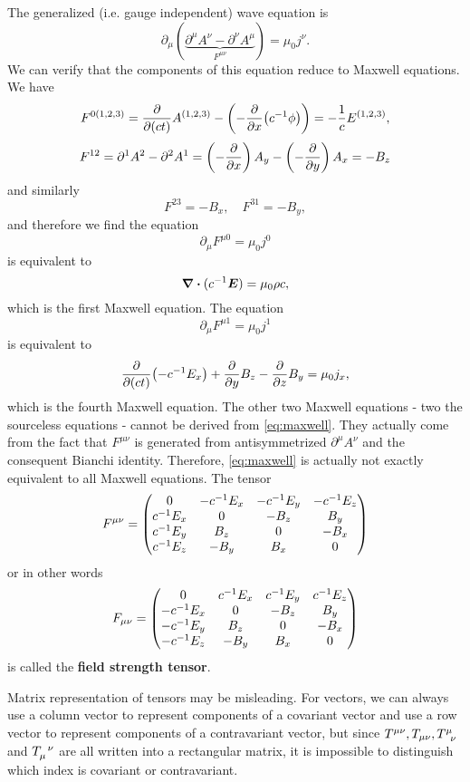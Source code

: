 \documentclass[hyperref, a4paper]{article}
\newcommand*{\concept}[1]{{\textbf{#1}}}
\begin{document}
The generalized (i.e. gauge independent) wave equation is 
\begin{equation}
    \partial_\mu (\underbrace{\partial^\mu A^\nu - \partial^\nu A^\mu}_{F^{\mu \nu}}) = \mu_0 j^\nu.
    \label{eq:maxwell}
\end{equation}
We can verify that the components of this equation reduce to Maxwell equations. 
We have 
\[
    F^{0(1,2,3)} = \pdv{(ct)} A^{(1,2,3)} - \left( - \pdv{x} (c^{-1} \phi) \right) = - \frac{1}{c} E^{(1,2,3)},
\]
\[
    F^{12} = \partial^1 A^2 - \partial^2 A^1 = \left( - \pdv{x} \right) A_y - \left( - \pdv{y} \right) A_x = - B_z
\]
and similarly 
\[
    F^{23} = - B_x, \quad F^{31} = - B_y,
\]
and therefore we find the equation
\[
    \partial_\mu F^{\mu 0} = \mu_0 j^0
\]
is equivalent to 
\[
    \div{(c^{-1} \vb*{E})} = \mu_0 \rho c,
\]
which is the first Maxwell equation. The equation
\[
    \partial_\mu F^{\mu 1} = \mu_0 j^1
\]
is equivalent to 
\[
    \pdv{(ct)} (- c^{-1} E_x) + \pdv{y} B_z - \pdv{z} B_y = \mu_0 j_x,
\]
which is the fourth Maxwell equation. The other two Maxwell equations - two the sourceless equations - cannot 
be derived from \eqref{eq:maxwell}. They actually come from the fact that $F^{\mu \nu}$ is generated from 
antisymmetrized $\partial^\mu A^\nu$ and the consequent Bianchi identity. Therefore, \eqref{eq:maxwell} is 
actually not exactly equivalent to all Maxwell equations. The tensor 
\begin{equation}
    F^{\mu \nu} = \pmqty{ 0 & - c^{-1} E_x & - c^{-1} E_y & - c^{-1} E_z \\
    c^{-1} E_x & 0 & - B_z & B_y \\
    c^{-1} E_y & B_z & 0 & - B_x \\
    c^{-1} E_z & - B_y & B_x & 0 }
\end{equation}
or in other words 
\begin{equation}
    F_{\mu \nu} = \pmqty{ 0 & c^{-1} E_x & c^{-1} E_y & c^{-1} E_z \\
    -c^{-1} E_x & 0 & - B_z & B_y \\
    -c^{-1} E_y & B_z & 0 & - B_x \\
    -c^{-1} E_z & - B_y & B_x & 0 }
\end{equation}
is called the \concept{field strength tensor}.

\begin{note*}{}{}
    Matrix representation of tensors may be misleading. For vectors, we can always use a column vector to 
    represent components of a covariant vector and use a row vector to represent components of a contravariant
    vector, but since $T^{\mu \nu}, T_{\mu \nu}, T\indices{^\mu_\nu}$ and $T\indices{_\mu^\nu}$ are all written
    into a rectangular matrix, it is impossible to distinguish which index is covariant or contravariant. 
\end{note*}
\end{document}

